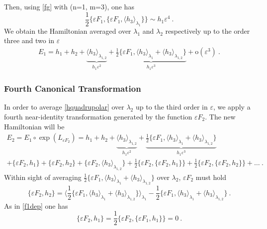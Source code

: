 \documentclass[a4paper]{article}
\begin{document}
Then, using \eqref{fg} with (n=1, m=3), one has
\begin{equation}
 \frac{1}{2}\{\varepsilon F_{1},\{\varepsilon F_{1}, \langle h_{3} \rangle _{\lambda_{1}}\}\} \sim h_{1}\varepsilon^{4} \ .
\end{equation}
We obtain the Hamiltonian averaged over $\lambda_{1}$ and $\lambda_{2}$ respectively up to the order three and two in $\varepsilon$
\begin{gather}
E_{1}=h_{1}+h_{2}+\underbrace{ \langle h_{3} \rangle _{\lambda_{1,2}}}_{h_{1}\varepsilon^{2}} + \underbrace{\frac{1}{2}\{\varepsilon F_{1}, \langle h_{3} \rangle _{\lambda_{1}} +  \langle h_{3} \rangle _{\lambda_{1,2}}\}}_{h_{1}\varepsilon^{3}}+\text{o}(\varepsilon^{3}) \ .
\label{E11}
\end{gather}
\subsubsection{Fourth Canonical Transformation}
In order to average \eqref{hquadrupolar} over $\lambda_{2}$ up to the third order in $\varepsilon$, we apply a fourth near-identity transformation generated by the function $\varepsilon F_{2}$. 
The new Hamiltonian will be
\begin{multline}
E_{2}=E_{1} \circ \exp (L_{\varepsilon F_{2}})= h_{1}+h_{2}+\underbrace{ \langle h_{3} \rangle _{\lambda_{1,2}}}_{h_{1}\varepsilon^{2}} + \underbrace{\frac{1}{2}\{\varepsilon F_{1}, \langle h_{3} \rangle _{\lambda_{1}} +  \langle h_{3} \rangle _{\lambda_{1,2}}\}}_{h_{1}\varepsilon^{3}} \\
+\{\varepsilon F_{2},h_{1}\}+\{\varepsilon F_{2},h_{2}\}+\{\varepsilon F_{2}, \langle h_{3} \rangle _{\lambda_{1,2}}\} 
+\frac{1}{2}\{\varepsilon F_{2},\{\varepsilon F_{2},h_{1}\}\}+\frac{1}{2}\{\varepsilon F_{2},\{\varepsilon F_{2},h_{2}\}\}+\ldots \ .
\label{E2}
\end{multline}
Within sight of averaging $\frac{1}{2}\{\varepsilon F_{1}, \langle h_{3} \rangle _{\lambda_{1}} +  \langle h_{3} \rangle _{\lambda_{1,2}}\}$ over $\lambda_{2}$, $\varepsilon F_{2}$ must hold
\begin{equation}
\label{he4}
\{\varepsilon F_{2},h_{2}\}= \langle {\frac{1}{2}\{\varepsilon F_{1}, \langle h_{3} \rangle _{\lambda_{1}} +  \langle h_{3} \rangle _{\lambda_{1,2}}\}} \rangle _{\lambda_{1}}-\frac{1}{2}\{\varepsilon F_{1}, \langle h_{3} \rangle _{\lambda_{1}} +  \langle h_{3} \rangle _{\lambda_{1,2}}\} \ .
\end{equation}
As in \eqref{f1dep} one has
\begin{equation}
\{\varepsilon F_{2},h_{1}\}=\frac{1}{2}\{\varepsilon F_{2},\{\varepsilon F_{1},h_{1}\}\}=0 \ .
\end{equation}
\end{document}

